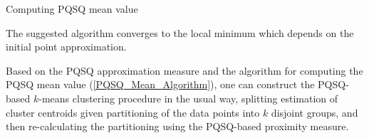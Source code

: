 \documentclass[preprint,12pt,twocolumn]{elsarticle}
\makeatletter
\def\BState{\State\hskip-\ALG@thistlm}
\makeatother
\begin{document}
\begin{algorithm}
\caption{Computing PQSQ mean value}\label{PQSQ_Mean_Algorithm}
\end{algorithm}

The suggested algorithm converges to the local minimum which depends on the initial point approximation.

Based on the PQSQ approximation measure and the algorithm for computing the PQSQ mean value (\ref{PQSQ_Mean_Algorithm}), one can construct the PQSQ-based $k$-means clustering procedure in the usual way, splitting estimation of cluster centroids given partitioning of the data points into $k$ disjoint groups, and then re-calculating the partitioning using the PQSQ-based proximity measure.
\end{document}
